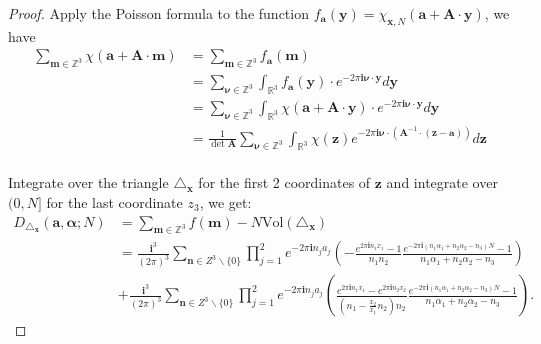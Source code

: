 \documentclass[11pt]{article}
\newcommand{\fc}{\frac}
\newcommand{\Z}{\mathbb{Z}}
\newcommand{\R}{\mathbb{R}}
\renewcommand{\a}{\alpha}
\renewcommand{\i}{\mathbf{i}}
\renewcommand{\(}{\left(}
\renewcommand{\)}{\right)}
\renewcommand{\bf}{\mathbf}
\newcommand{\Vol}{\text{Vol}}
\newcommand{\tria}{\triangle_{\bf{x}}}
\newcommand{\<}{\langle}
\renewcommand{\>}{\rangle}
\begin{document}
\begin{proof}
Apply the Poisson formula to the function $f_{\bm{a}}(\bf{y})=\chi_{\bf{x}, N}(\bm{a}+\bf{A}\cdot \bf{y})$, we have 
$$\begin{aligned}
\sum \limits_{\bf{m}\in\mathbb{Z}^3}\chi(\bm{a}+\bf{A}\cdot \bf{m})
&=\sum\limits_{\bf{m}\in\Z^3} f_{\bm{a}}(\bf{m}) \\
&=\sum \limits_{\bm{\nu} \in \Z^3} \int_{\R^3} f_{\bm{a}}(\bf{y}) \cdot  e^{-2\pi \i \bm{\nu} \cdot \bf{y}} d\bf{y}   \\
&=\sum \limits_{\bm{\nu} \in \Z^3} \int_{\R^3} \chi(\bm{a}+\bf{A}\cdot \bf{y}) \cdot  e^{-2\pi \i \bm{\nu} \cdot \bf{y}} d\bf{y}   \\
&=\frac{1}{\det{\bf{A}}}\sum \limits_{\bm{\nu}\in \Z^3}\int_{\R^3} \chi(\bf{z}) e^{-2\pi \i \bm{\nu} \cdot(\bf{A}^{-1}\cdot (\bf{z}-\bm{a}))}d\bf{z}    \\
\end{aligned} 
$$

Integrate over the triangle $\tria$ for the first 2 coordinates of $\bf{z}$ and integrate over $(0,N]$ for the last coordinate $z_3$, we get: 
$$\begin{aligned}
D_{\triangle_{\bf{x}}} (\bm{a},\bm{\a}; N)
&=\sum_{\bf{m}\in \Z^3} f(\bf{m})- N\Vol(\tria) \\
&=\fc{\i^3}{(2\pi)^3} \sum_{\bf{n}\in Z^3\backslash\{0\}} 
\prod_{j=1}^2 e^{-2\pi \i n_ja_j}\(-\fc{e^{2\pi \i n_1x_1}-1}{n_1 n_2}\fc{e^{-2\pi \i (n_1\a_1+n_2\a_2-n_3)N}-1}{n_1\a_1+n_2\a_2-n_3}\)\\
&+\fc{\i^3}{(2\pi)^3} \sum_{\bf{n}\in Z^3\backslash\{0\}} 
\prod_{j=1}^2 e^{-2\pi \i n_ja_j}\(\fc{e^{2\pi\i n_1x_1}-e^{2\pi\i n_2 x_2}}{(n_1-\fc{x_2}{x_1}n_2)n_2}\fc{e^{-2\pi \i (n_1\a_1+n_2\a_2-n_3)N}-1}{n_1\a_1+n_2\a_2-n_3}\).
\end{aligned}
$$
\end{proof}

\end{document}
